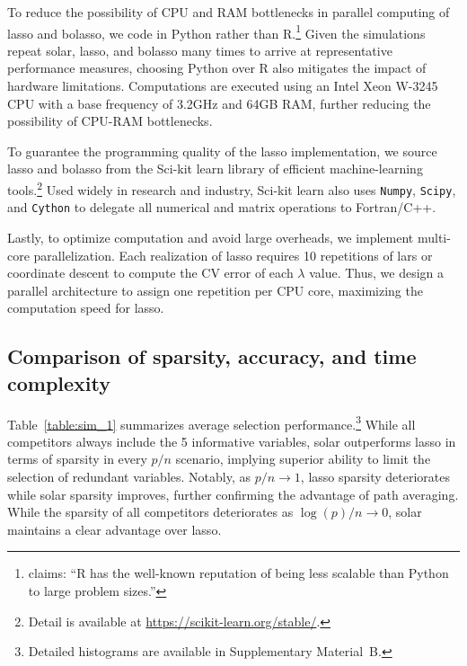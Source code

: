 \documentclass[11pt,review,authoryear]{elsarticle}
\begin{document}
To reduce the possibility of CPU and RAM bottlenecks in parallel computing of lasso and bolasso, we code in Python rather than \textsf{R}.\footnote{\citet{donoho201750} claims: ``\textsf{R} has the well-known reputation of being less scalable than Python to large problem sizes.''} Given the simulations repeat solar, lasso, and bolasso many times to arrive at representative performance measures, choosing Python over \textsf{R} also mitigates the impact of hardware limitations. Computations are executed using an Intel Xeon W-3245 CPU with a base frequency of 3.2GHz and 64GB RAM, further reducing the possibility of CPU-RAM bottlenecks.

To guarantee the programming quality of the lasso implementation, we source lasso and bolasso from the Sci-kit learn library \citep{scikit-learn} of efficient machine-learning tools.\footnote{Detail is available at \url{https://scikit-learn.org/stable/}.} Used widely in research and industry, Sci-kit learn also uses \texttt{Numpy}, \texttt{Scipy}, and \texttt{Cython} to delegate all numerical and matrix operations to Fortran/C++.

Lastly, to optimize computation and avoid large overheads, we implement multi-core parallelization. Each realization of lasso requires 10 repetitions of lars or coordinate descent to compute the CV error of each $\lambda$ value. Thus, we design a parallel architecture to assign one repetition per CPU core, maximizing the computation speed for lasso.

\subsection{Comparison of sparsity, accuracy, and time complexity \label{subsection:suml1}}

Table~\ref{table:sim_1} summarizes average selection performance.\footnote{Detailed histograms are available in Supplementary Material~B.} While all competitors always include the 5 informative variables, solar outperforms lasso in terms of sparsity in every $p/n$ scenario, implying superior ability to limit the selection of redundant variables. Notably, as $p/n\rightarrow1$, lasso sparsity deteriorates while solar sparsity improves, further confirming the advantage of path averaging. While the sparsity of all competitors deteriorates as $\log(p)/n\rightarrow0$, solar maintains a clear advantage over lasso.
\end{document}
